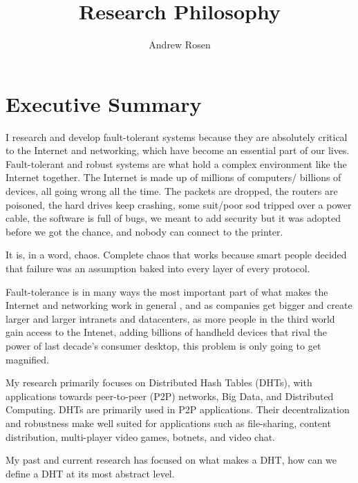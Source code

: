 \documentclass[10pt, a4paper]{article}
\author{Andrew Rosen}
\title{Research Philosophy}
\date{}
\begin{document}
\maketitle



\section*{Executive Summary}



I research and develop fault-tolerant systems because they are absolutely critical to the Internet and networking, which have become an essential part of our lives.
Fault-tolerant and robust systems are what hold a complex environment like the Internet together.
The Internet is made up of millions of computers/ billions of devices, all going wrong all the time.
The packets are dropped, the routers are poisoned, the hard drives keep crashing, some suit/poor sod tripped over a power cable, the software is full of bugs, we meant to add security but it was adopted before we got the chance, and nobody can connect to the printer.

It is, in a word, chaos.
Complete chaos that works because smart people decided that failure was an assumption baked into every layer of every protocol.

Fault-tolerance is in many ways the most important part of what makes the Internet and networking work in general , and as companies get bigger and create larger and larger intranets and datacenters, as more people in the third world gain access to the Intenet, adding billions of handheld devices that rival the power of last decade's consumer desktop, this problem is only going to get magnified.


My research primarily focuses on Distributed Hash Tables (DHTs), with applications towards peer-to-peer (P2P) networks, Big Data, and Distributed Computing.
DHTs are primarily used in P2P applications. 
Their decentralization and robustness make well suited for applications such as file-sharing, content distribution, multi-player video games, botnets, and video chat.



My past and current research has focused on what makes a DHT, how can we define a DHT at its most abstract level.
\end{document}
